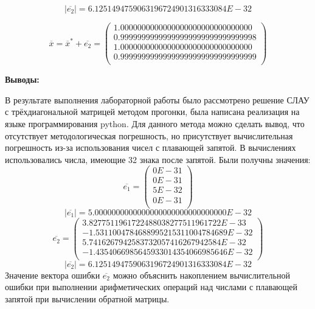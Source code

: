 \documentclass [12pt]{article}
\begin{document}
$$|\overline{e_2}| = 6.1251494759063196724901316333084E-32$$

$$\overline{x} = \overline{x}^* + \overline{e_2} = \left(\begin{array}{c}
1.0000000000000000000000000000000 \\
0.99999999999999999999999999999998 \\
1.0000000000000000000000000000000 \\
0.99999999999999999999999999999999 \\
\end{array}\right)$$


\textbf{Выводы:}

В результате выполнения лабораторной работы было рассмотрено решение СЛАУ с трёхдиагональной матрицей методом прогонки, была написана реализация на языке программирования python. Для данного метода можно сделать вывод, что отсутствует методологическая погрешность, но присутствует вычислительная погрешность из-за использования чисел с плавающей запятой.
В вычислениях использовались числа, имеющие 32 знака после запятой. Были получны значения:
$$\overline{e_1} = \left(\begin{array}{c}
0E-31 \\
0E-31 \\
5E-32 \\
0E-31 \\
\end{array}\right)
$$
$$|\overline{e_1}| = 5.0000000000000000000000000000000E-32$$
$$\overline{e_2} = \left(\begin{array}{c}
3.8277511961722488038277511961722E-33 \\
-1.5311004784688995215311004784689E-32 \\
5.7416267942583732057416267942584E-32 \\
-1.4354066985645933014354066985646E-32 \\
\end{array}\right)
$$
$$|\overline{e_2}| = 6.1251494759063196724901316333084E-32$$
Значение вектора ошибки $\overline{e_2}$ можно объяснить накоплением вычислительной ошибки при выполнении арифметических операций над числами с плавающей запятой при вычислении обратной матрицы.
\end{document}
